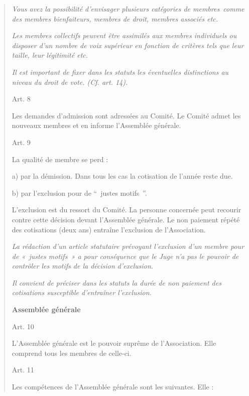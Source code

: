 \documentclass[
]{article}
\begin{document}
\begin{quote}
\emph{Vous avez la possibilité d'envisager plusieurs catégories de
membres~comme des membres bienfaiteurs, membres de droit, membres
associés etc.}

\emph{Les membres collectifs peuvent être assimilés aux membres
individuels ou disposer d'un nombre de voix supérieur en fonction de
critères tels que leur taille, leur légitimité etc.}

\emph{Il est important de fixer dans les statuts les éventuelles
distinctions au niveau du droit de vote. (Cf. art. 14).}

Art. 8

Les demandes d'admission sont adressées au Comité. Le Comité admet les
nouveaux membres et en informe l'Assemblée générale.

Art. 9

La qualité de membre se perd :

a) par la démission. Dans tous les cas la cotisation de l'année reste
due.

b) par l'exclusion pour de ``~justes motifs~''.

L'exclusion est du ressort du Comité. La personne concernée peut
recourir contre cette décision devant l'Assemblée générale. Le non
paiement répété des cotisations (deux ans) entraîne l'exclusion de
l'Association.

\emph{La rédaction d'un article statutaire prévoyant l'exclusion d'un
membre pour de «~justes motifs~» a pour conséquence que le Juge n'a pas
le pouvoir de contrôler les motifs de la décision d'exclusion.}

\emph{Il convient de préciser dans les statuts la durée de non paiement
des cotisations susceptible d'entraîner l'exclusion.}

\textbf{Assemblée générale}

Art. 10

L'Assemblée générale est le pouvoir suprême de l'Association. Elle
comprend tous les membres de celle-ci.

Art. 11

Les compétences de l'Assemblée générale sont les suivantes. Elle :
\end{quote}
\end{document}
